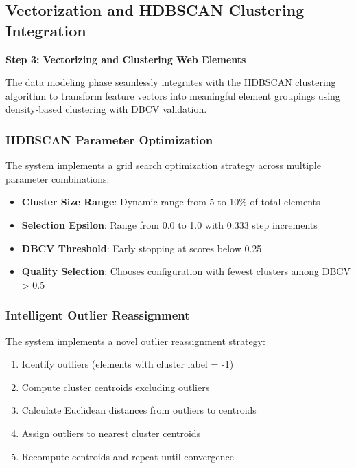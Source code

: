 \subsection{Vectorization and HDBSCAN Clustering Integration}
\label{subsec:clustering-integration}

\textbf{Step 3: Vectorizing and Clustering Web Elements}

The data modeling phase seamlessly integrates with the HDBSCAN clustering algorithm to transform feature vectors into meaningful element groupings using density-based clustering with DBCV validation.

\subsubsection{HDBSCAN Parameter Optimization}
The system implements a grid search optimization strategy across multiple parameter combinations:

\begin{itemize}
    \item \textbf{Cluster Size Range}: Dynamic range from 5 to 10\% of total elements
    \item \textbf{Selection Epsilon}: Range from 0.0 to 1.0 with 0.333 step increments  
    \item \textbf{DBCV Threshold}: Early stopping at scores below 0.25
    \item \textbf{Quality Selection}: Chooses configuration with fewest clusters among DBCV > 0.5
\end{itemize}

\subsubsection{Intelligent Outlier Reassignment}
The system implements a novel outlier reassignment strategy:

\begin{enumerate}
    \item Identify outliers (elements with cluster label = -1)
    \item Compute cluster centroids excluding outliers
    \item Calculate Euclidean distances from outliers to centroids
    \item Assign outliers to nearest cluster centroids
    \item Recompute centroids and repeat until convergence
\end{enumerate}

